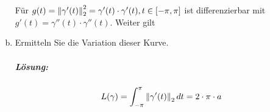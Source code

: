 \documentclass{scrreprt}
\begin{document}
\begin{enumerate}[a)]
  Für $g(t) = \norm{\gamma'(t)}_2^2 = \gamma'(t) \cdot \gamma'(t), t \in [-\pi, \pi]$
  ist differenzierbar mit $g'(t) = \gamma''(t) \cdot \gamma''(t)$.
  Weiter gilt

\item Ermitteln Sie die Variation dieser Kurve.
  \subparagraph{Lösung:}
  \[
    L(\gamma) = \int_{-\pi}^{\pi} \norm{\gamma'(t)}_2\,dt = 2 \cdot \pi \cdot a
  \]
\end{enumerate}
\end{document}
